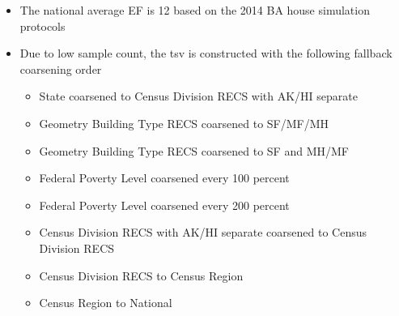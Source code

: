 \begin{itemize}
\item The national average EF is 12 based on the 2014 BA house simulation protocols
\item Due to low sample count, the tsv is constructed with the following fallback coarsening order
  \begin{itemize}
  \item State coarsened to Census Division RECS with AK/HI separate
  \item Geometry Building Type RECS coarsened to SF/MF/MH
  \item Geometry Building Type RECS coarsened to SF and MH/MF
  \item Federal Poverty Level coarsened every 100 percent
  \item Federal Poverty Level coarsened every 200 percent
  \item Census Division RECS with AK/HI separate coarsened to Census Division RECS
  \item Census Division RECS to Census Region
  \item Census Region to National
  \end{itemize}
\end{itemize}
